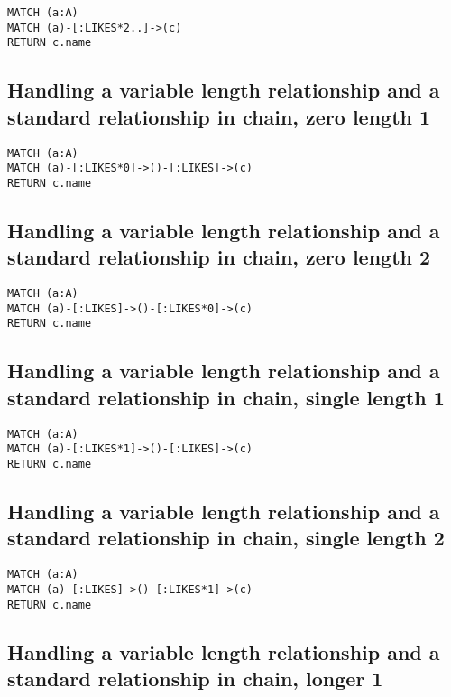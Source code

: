 \begin{lstlisting}
MATCH (a:A)
MATCH (a)-[:LIKES*2..]->(c)
RETURN c.name
\end{lstlisting}

\subsection{Handling a variable length relationship and a standard relationship in chain, zero length 1}

\begin{lstlisting}
MATCH (a:A)
MATCH (a)-[:LIKES*0]->()-[:LIKES]->(c)
RETURN c.name
\end{lstlisting}

\subsection{Handling a variable length relationship and a standard relationship in chain, zero length 2}

\begin{lstlisting}
MATCH (a:A)
MATCH (a)-[:LIKES]->()-[:LIKES*0]->(c)
RETURN c.name
\end{lstlisting}

\subsection{Handling a variable length relationship and a standard relationship in chain, single length 1}

\begin{lstlisting}
MATCH (a:A)
MATCH (a)-[:LIKES*1]->()-[:LIKES]->(c)
RETURN c.name
\end{lstlisting}

\subsection{Handling a variable length relationship and a standard relationship in chain, single length 2}

\begin{lstlisting}
MATCH (a:A)
MATCH (a)-[:LIKES]->()-[:LIKES*1]->(c)
RETURN c.name
\end{lstlisting}

\subsection{Handling a variable length relationship and a standard relationship in chain, longer 1}

